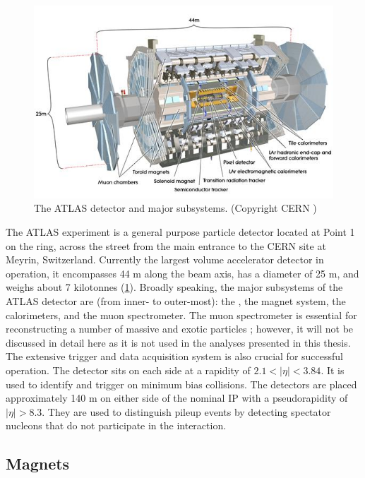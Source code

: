 \begin{figure}[t]
\includegraphics{ATLAS_layout.jpg}
\caption{The ATLAS detector and major subsystems. (Copyright CERN \cite{Pequenao:1095924})}
\label{fig:atlas_layout}
\end{figure}

The ATLAS experiment is a general purpose particle detector \cite{Aad:2008zzm} located at Point 1 on the \lhc ring, across the street from the main entrance to the CERN site at Meyrin, Switzerland.
Currently the largest volume accelerator detector in operation, it encompasses 44 m along the beam axis, has a diameter of 25 m, and weighs about 7 kilotonnes (\cref{fig:atlas_layout}).
Broadly speaking, the major subsystems of the ATLAS detector are (from inner- to outer-most): the \id, the magnet system, the calorimeters, and the muon spectrometer.
The muon spectrometer is essential for reconstructing a number of massive and exotic particles \cite{ATLAS:1997ad}; however, it will not be discussed in detail here as it is not used in the analyses presented in this thesis.
The extensive trigger and data acquisition system is also crucial for successful operation.
The \mbts detector sits on each side at a rapidity of $2.1 < |\eta| < 3.84$.
It is used to identify and trigger on minimum bias collisions.
The \zdc detectors are placed approximately 140 m on either side of the nominal \ac{IP} with a pseudorapidity of $|\eta| > 8.3$.
They are used to distinguish pileup events by detecting spectator nucleons that do not participate in the interaction.


\subsection{Magnets}
\label{subsec:atlas_magnet}

